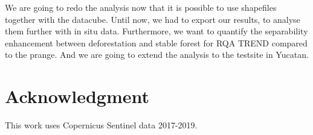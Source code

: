 \documentclass{article}
\begin{document}
We are going to redo the analysis now that it is possible to use shapefiles together with the datacube. 
Until now, we had to export our results, to analyse them further with in situ data. 
Furthermore, we want to quantify the separability enhancement between deforestation and stable forest for RQA TREND compared to the prange. 
And we are going to extend the analysis to the testsite in Yucatan. 



\section*{Acknowledgment}
This work uses Copernicus Sentinel data 2017-2019.




\end{document}
